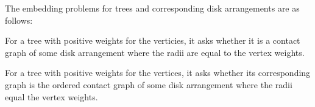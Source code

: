 The embedding problems for trees and corresponding disk arrangements are as follows:
\begin{prob}\label{problem:UnorderedTree}
For a tree with positive weights for the verticies, it asks whether it is a contact graph of some 
disk arrangement where the radii are equal to the vertex weights.
\end{prob}

\begin{prob}\label{problem:OrderedTree}
For a tree with positive weights for the vertices, it asks whether its corresponding graph is the 
ordered contact graph of some disk arrangement where the radii equal the vertex weights.
\end{prob}

